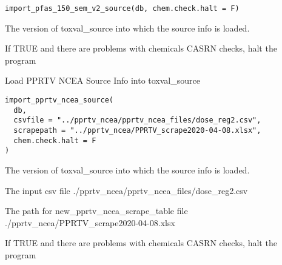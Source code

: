\documentclass[letterpaper]{book}
\begin{document}
%
\begin{Usage}
\begin{verbatim}
import_pfas_150_sem_v2_source(db, chem.check.halt = F)
\end{verbatim}
\end{Usage}
%
\begin{Arguments}
\begin{ldescription}
\item[\code{db}] The version of toxval\_source into which the source info is loaded.

\item[\code{chem.check.halt}] If TRUE and there are problems with chemicals CASRN checks, halt the program
\end{ldescription}
\end{Arguments}
%
\begin{Description}\relax
Load PPRTV NCEA Source Info into toxval\_source
\end{Description}
%
\begin{Usage}
\begin{verbatim}
import_pprtv_ncea_source(
  db,
  csvfile = "../pprtv_ncea/pprtv_ncea_files/dose_reg2.csv",
  scrapepath = "../pprtv_ncea/PPRTV_scrape2020-04-08.xlsx",
  chem.check.halt = F
)
\end{verbatim}
\end{Usage}
%
\begin{Arguments}
\begin{ldescription}
\item[\code{db}] The version of toxval\_source into which the source info is loaded.

\item[\code{csvfile}] The input csv file ./pprtv\_ncea/pprtv\_ncea\_files/dose\_reg2.csv

\item[\code{scrapepath}] The path for new\_pprtv\_ncea\_scrape\_table file ./pprtv\_ncea/PPRTV\_scrape2020-04-08.xlsx

\item[\code{chem.check.halt}] If TRUE and there are problems with chemicals CASRN checks, halt the program
\end{ldescription}
\end{Arguments}
%
\end{document}
